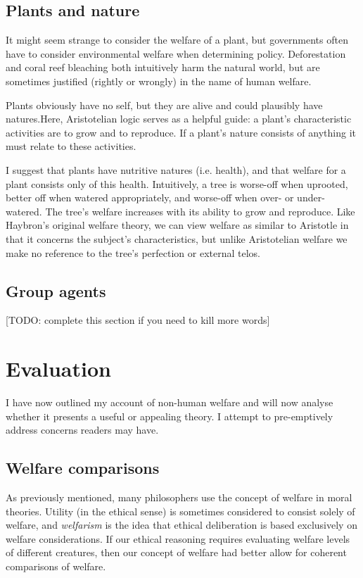 \documentclass{article}
\begin{document}
\subsection{Plants and nature}

It might seem strange to consider the welfare of a plant, but governments often have to consider environmental welfare when determining policy. Deforestation and coral reef bleaching both intuitively harm the natural world, but are sometimes justified (rightly or wrongly) in the name of human welfare. 

Plants obviously have no self, but they are alive and could plausibly have natures.Here, Aristotelian logic serves as a helpful guide: a plant's characteristic activities are to grow and to reproduce. If a plant's nature consists of anything it must relate to these activities. 

I suggest that plants have nutritive natures (i.e. health), and that welfare for a plant consists only of this health. Intuitively, a tree is worse-off when uprooted, better off when watered appropriately, and worse-off when over- or under-watered. The tree's welfare increases with its ability to grow and reproduce. Like Haybron's original welfare theory, we can view welfare as similar to Aristotle in that it concerns the subject's characteristics, but unlike Aristotelian welfare we make no reference to the tree's perfection or external telos.

\subsection{Group agents}

[TODO: complete this section if you need to kill more words]

\section{Evaluation}

I have now outlined my account of non-human welfare and will now analyse whether it presents a useful or appealing theory. I attempt to pre-emptively address concerns readers may have.

\subsection{Welfare comparisons}

As previously mentioned, many philosophers use the concept of welfare in moral theories. Utility (in the ethical sense) is sometimes considered to consist solely of welfare, and \textit{welfarism} is the idea that ethical deliberation is based exclusively on welfare considerations. If our ethical reasoning requires evaluating welfare levels of different creatures, then our concept of welfare had better allow for coherent comparisons of welfare.
\end{document}
